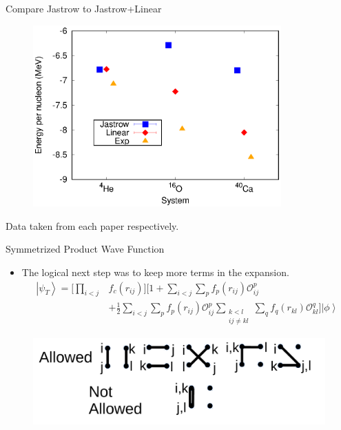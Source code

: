 \documentclass{beamer}
\newcommand{\ket}[1]{\left| #1 \right>}
\newcommand{\fpij}{f_p(r_{ij})}
\newcommand{\Opij}{\mathcal{O}_{ij}^p}
\newcommand{\fOpij}{\sum\limits_{i<j}\sum\limits_p \fpij\Opij}
\newcommand{\fqkl}{f_q(r_{kl})}
\newcommand{\Oqkl}{\mathcal{O}_{kl}^q}
\newcommand{\fOqklquad}{\sum_{\substack{k<l\\ij \ne kl}}\sum\limits_q \fqkl\Oqkl}
\begin{document}
\begin{frame}{Compare Jastrow to Jastrow+Linear}
\begin{figure}[h]
   \centering
   \includegraphics[width=0.85\textwidth]{../figures/energy_jaslin.eps}
\end{figure}
\vspace{-0.5cm}
{\tiny Data taken from each paper respectively.}
\end{frame}

\begin{frame}{Symmetrized Product Wave Function}
\begin{itemize}
   \item The logical next step was to keep more terms in the expansion.
   \begin{equation*}
   \begin{split}
      \ket{\psi_T} = \Bigg[\prod\limits_{i<j}&f_c(r_{ij})\Bigg] \Bigg[1+\fOpij \\
      & + \frac{1}{2}\fOpij\fOqklquad \Bigg] \ket{\phi}
   \end{split}
   \end{equation*}
\end{itemize}
\begin{figure}[h]
   \centering
   \includegraphics[width=1.0\textwidth]{../figures/pairing_fullquad.pdf}
\end{figure}
\end{frame}
\end{document}
